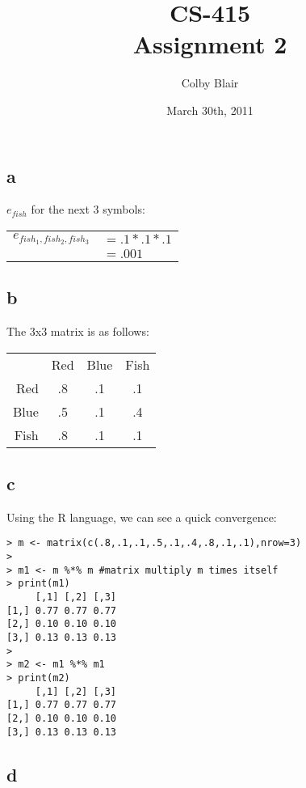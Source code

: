 \documentclass[12pt]{article}
\title{CS-415 \\
	Assignment 2
}
\author{Colby Blair}
\date{March 30th, 2011}
\begin{document}
	\maketitle

\pagebreak

\section{}

\subsection*{a}
$ e_{fish} $ for the next 3 symbols:

\begin{tabular}{l l}
	$ e_{fish_{1},fish_{2},fish_{3}} $ 	& $ = .1 * .1 * .1 $ \\
							& $ = .001 $ \\
\end{tabular}

\subsection*{b}
The 3x3 matrix is as follows:

\begin{tabular}{r c c c}
		& 	Red	&	Blue	& 	Fish	\\
	Red	&	.8	&	.1	&	.1	\\
	Blue	&	.5	&	.1	&	.4	\\
	Fish	&	.8	&	.1	&	.1	\\
\end{tabular}

\subsection*{c}
Using the R language, we can see a quick convergence:

\begin{lstlisting}
> m <- matrix(c(.8,.1,.1,.5,.1,.4,.8,.1,.1),nrow=3)
> 
> m1 <- m %*% m #matrix multiply m times itself
> print(m1)
     [,1] [,2] [,3]
[1,] 0.77 0.77 0.77
[2,] 0.10 0.10 0.10
[3,] 0.13 0.13 0.13
> 
> m2 <- m1 %*% m1
> print(m2)
     [,1] [,2] [,3]
[1,] 0.77 0.77 0.77
[2,] 0.10 0.10 0.10
[3,] 0.13 0.13 0.13	
\end{lstlisting}

\subsection*{d}
\end{document}
